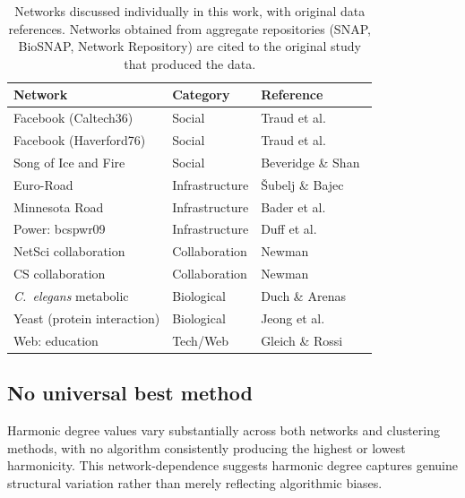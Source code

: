 \documentclass[twocolumn,superscriptaddress,tightenlines,aps,prx,floatfix]{revtex4-2}
\begin{document}
\begin{bibunit}
\begin{table}[h]
\centering
\caption{Networks discussed individually in this work, with original data references.
Networks obtained from aggregate repositories (SNAP, BioSNAP, Network Repository) are cited to the original study that produced the data.}
\label{tab:dataset_sources}
\begin{tabular}{lll}
\toprule
Network & Category & Reference \\
\midrule
Facebook (Caltech36)          & Social          & Traud et al.~\cite{traud2012social} \\
Facebook (Haverford76)        & Social          & Traud et al.~\cite{traud2012social} \\
Song of Ice and Fire          & Social          & Beveridge \& Shan~\cite{beveridge2016network} \\
Euro-Road                     & Infrastructure  & \v{S}ubelj \& Bajec~\cite{subelj2011euroroad} \\
Minnesota Road                & Infrastructure  & Bader et al.~\cite{bader2013dimacs10} \\  %
Power: bcspwr09               & Infrastructure  & Duff et al.~\cite{duff1989sparse} \\
NetSci collaboration          & Collaboration   & Newman~\cite{newman2006finding} \\
CS collaboration              & Collaboration   & Newman~\cite{newman2006finding} \\  %
\textit{C.~elegans} metabolic & Biological      & Duch \& Arenas~\cite{duch2005community} \\
Yeast (protein interaction)   & Biological      & Jeong et al.~\cite{jeong2001lethality} \\ %
Web: education                & Tech/Web        & Gleich \& Rossi~\cite{Network_Repository} \\ %
\bottomrule
\end{tabular}
\end{table}

\subsection{No universal best method}
Harmonic degree values vary substantially across both networks and clustering methods, with no algorithm consistently producing the highest or lowest harmonicity. This network-dependence suggests harmonic degree captures genuine structural variation rather than merely reflecting algorithmic biases.


\end{bibunit}
\end{document}

